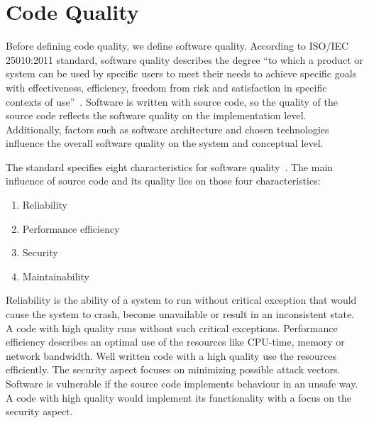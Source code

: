 \section{Code Quality}\label{sec:code_quality}
Before defining code quality, we define software quality. According to ISO/IEC 25010:2011 standard, software quality describes the degree \enquote{to which a product or system can be used by specific users to meet their needs to achieve specific goals with effectiveness, efficiency, freedom from risk and satisfaction in specific contexts of use}~\cite{iso_central_secretary_isoiec_2011-1}. Software is written with source code, so the quality of the source code reflects the software quality on the implementation level. Additionally, factors such as software architecture and chosen technologies influence the overall software quality on the system and conceptual level.

The standard specifies eight characteristics for software quality~\cite{iso_central_secretary_isoiec_2011-1}. The main influence of source code and its quality lies on those four characteristics:
\begin{enumerate}
    \item Reliability
    \item Performance efficiency
    \item Security
    \item Maintainability
\end{enumerate}
Reliability is the ability of a system to run without critical exception that would cause the system to crash, become unavailable or result in an inconsistent state. A code with high quality runs without such critical exceptions. Performance efficiency describes an optimal use of the resources like CPU-time, memory or network bandwidth. Well written code with a high quality use the resources efficiently. The security aspect focuses on minimizing possible attack vectors. Software is vulnerable if the source code implements behaviour in an unsafe way. A code with high quality would implement its functionality with a focus on the security aspect. 

